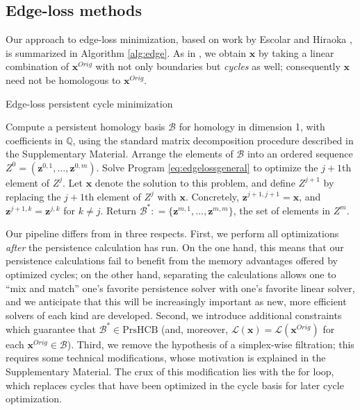 \documentclass[11pt,onecolumn]{article}
\newcommand{\Q}{\mathbb{Q}}
\newcommand{\originalrep}{\mathbf{x}^{Orig}}
\newcommand{\optimalrep}{\mathbf{x}}
\newcommand{\persinterval}{\mathcal{L}}
\newcommand{\setofpersistenthcyclebases}{\mathrm{PrsHCB}}
\newcommand{\hcyclebasis}{\mathcal B}
\newcommand{\obasis}{Z} %
\newcommand{\obasisel}{\mathbf{z}}  %
\theoremstyle{plain}
\theoremstyle{definition}
\begin{document}
\subsection{Edge-loss methods}
\label{sec:edgelossmethods}

 
Our approach to edge-loss minimization, based on work by Escolar and Hiraoka \cite{Escolar2016}, is summarized in Algorithm \ref{alg:edge}.  As in \cite{Escolar2016}, we obtain $\optimalrep$  by taking a linear combination of $\originalrep$ with not only boundaries but \emph{cycles} as well; consequently $\optimalrep$ need not be homologous to $\originalrep$.  
\begin{algorithm}
\caption{Edge-loss persistent cycle minimization}
\label{alg:edge}
\begin{algorithmic}[1]
\STATE Compute a persistent homology basis $\hcyclebasis$ for homology in dimension 1, with coefficients in $\Q$,  using the standard matrix decomposition procedure described in the Supplementary Material. Arrange the elements of $\hcyclebasis$ into an ordered sequence $\obasis^0 = (\obasisel^{0,1}, \ldots, \obasisel^{0,m})$.
\STATE Solve Program \eqref{eq:edgelossgeneral} to optimize the $j+1$th element of $\obasis^{j}$.  Let $\optimalrep$ denote the solution to this problem, and define $\obasis^{j+1}$ by replacing the $j+1$th element of $\obasis^{j}$ with $\optimalrep$.  Concretely, $\obasisel^{j+1,j+1} = \optimalrep$, and $\obasisel^{j+1,k} = \obasisel^{j,k}$ for $k \neq j$.
\ENDFOR
\STATE Return $\hcyclebasis^*: = \{\obasisel^{m,1}, \ldots, \obasisel^{m,m}\}$, the set of elements in $\obasis^m$.
\end{algorithmic}
\end{algorithm}

Our pipeline differs from \cite{Escolar2016} in three respects.  First, we perform all optimizations \emph{after} the persistence calculation has run.   On the one hand, this means that our persistence calculations  fail to  benefit from the memory advantages offered by optimized cycles; on the other hand, separating the calculations allows one to ``mix and match'' one's favorite persistence solver with one's favorite linear solver, and we anticipate that this will be increasingly important as new, more efficient solvers of each kind are developed.  Second, we introduce additional constraints which guarantee that $\hcyclebasis^* \in \setofpersistenthcyclebases$  
(and, moreover, $\persinterval( \optimalrep) = \persinterval( \originalrep)$ for each $\originalrep \in \hcyclebasis$). Third, we remove the hypothesis of a simplex-wise filtration; this requires some technical modifications, whose motivation is explained in the Supplementary Material. The crux of this modification lies with the for loop, which replaces cycles that have been optimized in the cycle basis for later cycle optimization.
\end{document}
